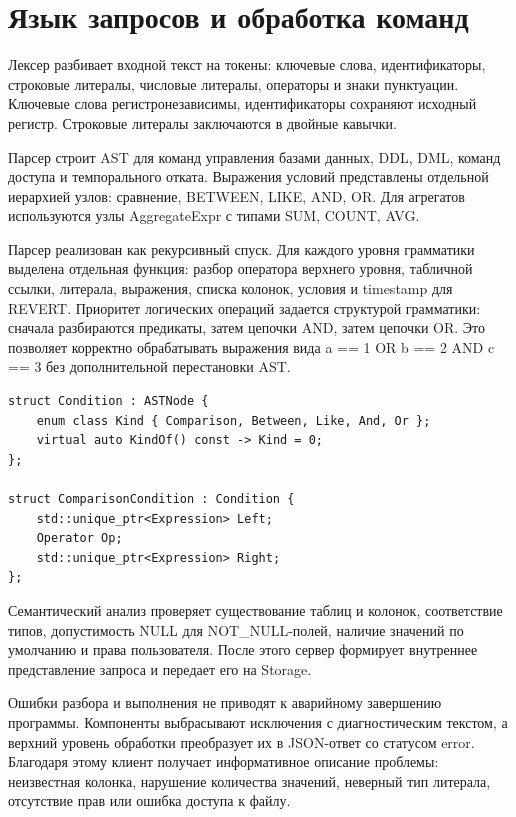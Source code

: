 \documentclass[a4paper,14pt]{extarticle}
\renewcommand{\texttt}[1]{\textrm{#1}}
\begin{document}
\section{Язык запросов и обработка команд}

Лексер разбивает входной текст на токены: ключевые слова, идентификаторы, строковые литералы, числовые литералы, операторы и знаки пунктуации. Ключевые слова регистронезависимы, идентификаторы сохраняют исходный регистр. Строковые литералы заключаются в двойные кавычки.

Парсер строит AST для команд управления базами данных, DDL, DML, команд доступа и темпорального отката. Выражения условий представлены отдельной иерархией узлов: сравнение, \texttt{BETWEEN}, \texttt{LIKE}, \texttt{AND}, \texttt{OR}. Для агрегатов используются узлы \texttt{AggregateExpr} с типами \texttt{SUM}, \texttt{COUNT}, \texttt{AVG}.

Парсер реализован как рекурсивный спуск. Для каждого уровня грамматики выделена отдельная функция: разбор оператора верхнего уровня, табличной ссылки, литерала, выражения, списка колонок, условия и timestamp для \texttt{REVERT}. Приоритет логических операций задается структурой грамматики: сначала разбираются предикаты, затем цепочки \texttt{AND}, затем цепочки \texttt{OR}. Это позволяет корректно обрабатывать выражения вида \texttt{a == 1 OR b == 2 AND c == 3} без дополнительной перестановки AST.

\begin{lstlisting}[style=qdbcpp,caption={Фрагмент иерархии условий AST}]
struct Condition : ASTNode {
    enum class Kind { Comparison, Between, Like, And, Or };
    virtual auto KindOf() const -> Kind = 0;
};

struct ComparisonCondition : Condition {
    std::unique_ptr<Expression> Left;
    Operator Op;
    std::unique_ptr<Expression> Right;
};
\end{lstlisting}

Семантический анализ проверяет существование таблиц и колонок, соответствие типов, допустимость \texttt{NULL} для \texttt{NOT\_NULL}-полей, наличие значений по умолчанию и права пользователя. После этого сервер формирует внутреннее представление запроса и передает его на Storage.

Ошибки разбора и выполнения не приводят к аварийному завершению программы. Компоненты выбрасывают исключения с диагностическим текстом, а верхний уровень обработки преобразует их в JSON-ответ со статусом \texttt{error}. Благодаря этому клиент получает информативное описание проблемы: неизвестная колонка, нарушение количества значений, неверный тип литерала, отсутствие прав или ошибка доступа к файлу.
\end{document}
